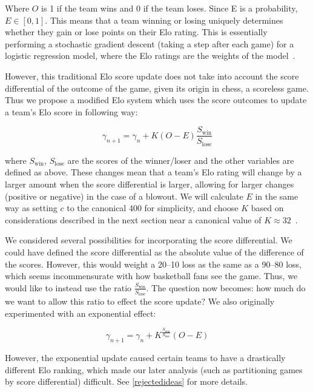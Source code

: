 \documentclass{article}
\begin{document}
Where $O$ is 1 if the team wins and 0 if the team loses. Since E is a probability,  $E \in [0, 1]$. This means that a team winning or losing uniquely determines whether they gain or lose points on their Elo rating. This is essentially performing a stochastic gradient descent (taking a step after each game) for a logistic regression model, where the Elo ratings are the weights of the model~\cite{stmorseStatisticalLearning}.

However, this traditional Elo score update does not take into account the score differential of the outcome of the game, given its origin in chess, a scoreless game. Thus we propose a modified Elo system which uses the score outcomes to update a team's Elo score in following way: 


\begin{equation}
\label{multiplyUpdate}
\gamma_{n+1} = \gamma_n + K(O - E)\frac{S_{\text{win}}}{S_{\text{lose}}}
\end{equation}


where $S_{\text{win}}$, $S_{\text{lose}}$ are the scores of the winner/loser and the other variables are defined as above. These changes mean that a team's Elo rating will change by a larger amount when the score differential is larger, allowing for larger changes (positive or negative) in the case of a blowout. We will calculate $E$ in the same way as setting $c$ to the canonical 400 for simplicity, and choose $K$ based on considerations described in the next section near a canonical value  of $K\approx 32$~\cite{mediumRatingSystem}.

We considered several possibilities for incorporating the score differential. We could have defined the score differential as the absolute value of the difference of the scores. However, this would weight a 20--10 loss as the same as a 90--80 loss, which seems incommensurate with how basketball fans see the game. Thus, we would like to instead use the ratio $\frac{S_{\text{win}}}{S_{\text{lose}}}$. The question now becomes: how much do we want to allow this ratio to effect the score update? We also originally experimented with an exponential effect:

\begin{equation}
    \label{exponentialUpdate}
    \gamma_{n+1} = \gamma_n + K^{\frac{S_{\text{win}}}{S_{\text{lose}}}}(O - E)
\end{equation}

However, the exponential update caused certain teams to have a drastically different Elo ranking, which made our later analysis (such as partitioning games by score differential) difficult. See \autoref{rejectedideas} for more details.
\end{document}
